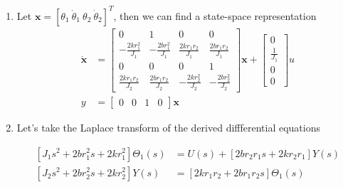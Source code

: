 \documentclass[twoside]{article}
\theoremstyle{definition}
\begin{document}
\begin{enumerate}
	\item Let $\mathbf{x} = \left[ \theta_1 \ \dot{\theta}_1 \
            \theta_2 \ \dot{\theta}_2 \right]^T$, then we can find a
          state-space representation
%
\begin{align*}
\dot{\mathbf{x}} &= \left[ \begin{array}{cccc} 0 & 1 & 0 & 0 \\
-\frac{2 k r_1^2}{J_1} & -\frac{2 b r_1^2}{J_1} & \frac{2 k r_1 r_2}{J_1} &
\frac{2 b r_1 r_2}{J_1}
\\
0 & 0 & 0 & 1 \\
\frac{2 k r_1 r_2}{J_2} & \frac{2 b r_1 r_2}{J_2} & -\frac{2 k r_2^2}{J_2} &
-\frac{2 b r_2^2}{J_2}
\end{array} \right] \mathbf{x} +
                   \left[ \begin{array}{c} 0 \\ \frac{1}{J_1} \\ 0 \\
                            0 \end{array} \right] u
\\
y &= \left[ \begin{array}{cccc} 0 & 0 & 1 & 0 \end{array} \right] \mathbf{x} 
\end{align*}

	\item Let's take the Laplace transform of the derived
          diffferential equations

\begin{align*}
\left[  J_1 s^2 + 2 b r_1^2 s + 2 k r_1^2 \right] \Theta_1(s) &= U(s)
                                                                +
\left[ 2 b r_2 r_1 s + 2 k r_2 r_1 \right] Y(s)
\\
\left[  J_2 s^2 + 2 b r_2^2 s + 2 k r_2^2 \right] Y(s) &= 
\left[ 2 k r_1 r_2 + 2 b r_1 r_2 s \right] \Theta_1(s)
\end{align*}


\end{enumerate}
\end{document}
